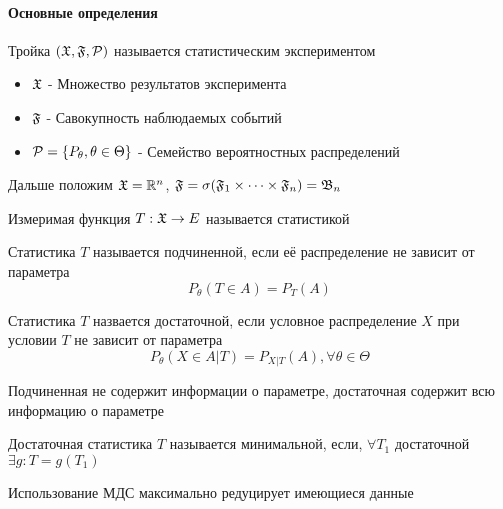\documentclass[main.tex]{subfiles}
\begin{document}
\paragraph{Основные определения}
\begin{definition}
	Тройка $(\mathfrak{X},\mathfrak{F},\mathcal{P})$ называется статистическим экспериментом
	\begin{itemize}
		\item $\mathfrak{X}$ - Множество результатов эксперимента
		\item $\mathfrak{F}$ - Савокупность наблюдаемых событий
		\item $\mathcal{P}=\{P_\theta, \theta \in \Theta\}$ - Семейство вероятностных распределений
	\end{itemize}
\end{definition}
Дальше положим $\mathfrak{X}=\mathbb{R}^n$, $\mathfrak{F}=\sigma(\mathfrak{F}_1 \times \dots \times \mathfrak{F}_n)=\mathfrak{B}_n$

\begin{definition}[Статистика]
	Измеримая функция $T:\mathfrak{X} \rightarrow E$ называется статистикой
\end{definition}

\begin{definition}
	Статистика $T$ называется подчиненной, если её распределение не зависит от параметра
	$$P_\theta (T\in A) = P_T(A)$$
\end{definition}

\begin{definition}
	Статистика $T$ назвается достаточной, если условное распределение $X$ при условии $T$ не зависит от параметра
	$$P_\theta(X\in A|T) = P_{X|T}(A),\forall \theta \in \Theta $$
\end{definition}

Подчиненная не содержит информации о параметре, достаточная содержит всю информацию о параметре

\begin{definition}
	Достаточная статистика $T$ называется минимальной, если, $\forall T_1$ достаточной ${\exists g : T=g(T_1)}$
\end{definition}
Использование МДС максимально редуцирует имеющиеся данные
\end{document}
